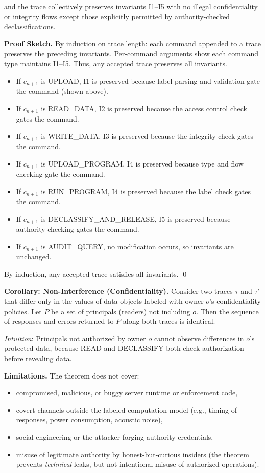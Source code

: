 and the trace collectively preserves invariants I1--I5 with no illegal confidentiality or integrity flows except those explicitly permitted by authority-checked declassifications.

\textbf{Proof Sketch.} By induction on trace length: each command appended to a trace preserves the preceding invariants. Per-command arguments show each command type maintains I1--I5. Thus, any accepted trace preserves all invariants.
\begin{itemize}
    \item If $c_{n+1}$ is UPLOAD, I1 is preserved because label parsing and validation gate the command (shown above).
    \item If $c_{n+1}$ is READ\_DATA, I2 is preserved because the access control check gates the command.
    \item If $c_{n+1}$ is WRITE\_DATA, I3 is preserved because the integrity check gates the command.
    \item If $c_{n+1}$ is UPLOAD\_PROGRAM, I4 is preserved because type and flow checking gate the command.
    \item If $c_{n+1}$ is RUN\_PROGRAM, I4 is preserved because the label check gates the command.
    \item If $c_{n+1}$ is DECLASSIFY\_AND\_RELEASE, I5 is preserved because authority checking gates the command.
    \item If $c_{n+1}$ is AUDIT\_QUERY, no modification occurs, so invariants are unchanged.
\end{itemize}

By induction, any accepted trace satisfies all invariants. \qed

\textbf{Corollary: Non-Interference (Confidentiality).}
Consider two traces $\tau$ and $\tau'$ that differ only in the values of data objects labeled with owner $o$'s confidentiality policies. Let $P$ be a set of principals (readers) not including $o$. Then the sequence of responses and errors returned to $P$ along both traces is identical.

\emph{Intuition}: Principals not authorized by owner $o$ cannot observe differences in $o$'s protected data, because READ and DECLASSIFY both check authorization before revealing data.

\textbf{Limitations.}
The theorem does not cover:
\begin{itemize}
    \item compromised, malicious, or buggy server runtime or enforcement code,
    \item covert channels outside the labeled computation model (e.g., timing of responses, power consumption, acoustic noise),
    \item social engineering or the attacker forging authority credentials,
    \item misuse of legitimate authority by honest-but-curious insiders (the theorem prevents \emph{technical} leaks, but not intentional misuse of authorized operations).
\end{itemize}


